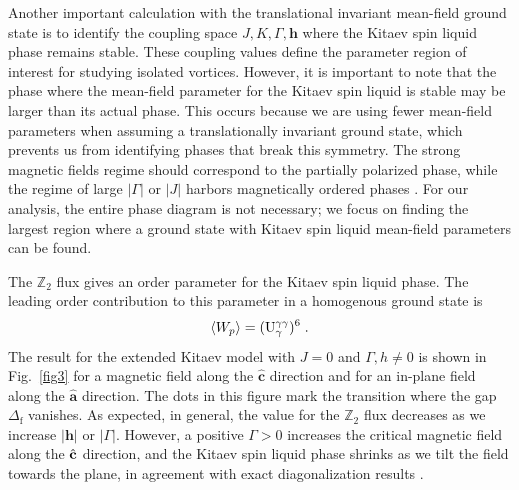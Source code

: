 Another important calculation with the translational invariant mean-field ground state is to identify the coupling space $J, K, \Gamma, \mathbf{h}$ where the Kitaev spin liquid phase remains stable. These coupling values define the parameter region of interest for studying isolated vortices. However, it is important to note that the phase where the mean-field parameter for the Kitaev spin liquid is stable may be larger than its actual phase. This occurs because we are using fewer mean-field parameters when assuming a translationally invariant ground state, which prevents us from identifying phases that break this symmetry.
The strong magnetic fields regime should correspond to the partially polarized phase, while the regime of large  $|\Gamma|$ or $|J|$ harbors magnetically ordered phases  \cite{Rau2014,Yadav2016,Gordon2019,Yilmaz2022}. %
For our analysis, the entire phase diagram is not necessary; we focus on finding the largest region where a ground state with Kitaev spin liquid mean-field parameters can be found.



The $\mathbb Z_2$ flux gives an order parameter for the Kitaev spin liquid phase. The leading order contribution to this parameter in a homogenous ground state is
\begin{equation}
    \braket{W_p}=(\mathrm{U}_{\gamma}^{\gamma\gamma})^6 \; .
\end{equation}
The result for the extended Kitaev model with $J=0$ and $\Gamma,h\neq0$ is shown in Fig.~\ref{fig3}
for a magnetic field along the $\hat{\mathbf c}$ direction and for an in-plane field along  the $\hat{\mathbf a}$ direction.    The dots in this figure mark the transition where the gap $\Delta_{\mathrm f}$ vanishes.  %
As expected, in general, the value for the $\mathbb Z_2$ flux decreases as we increase $|\mathbf{h}|$ or $|\Gamma|$.
However, a positive $\Gamma>0$ increases the critical magnetic field along the $\hat{\mathbf c}$ direction,
and the Kitaev spin liquid phase shrinks as we tilt the field towards the plane,  in agreement with exact diagonalization results \cite{Gordon2019}.

